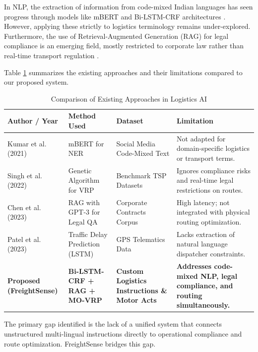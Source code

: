 \documentclass[conference]{IEEEtran}
\begin{document}
In NLP, the extraction of information from code-mixed Indian languages has seen progress through models like mBERT and Bi-LSTM-CRF architectures \cite{hinglish_ner}. However, applying these strictly to logistics terminology remains under-explored. Furthermore, the use of Retrieval-Augmented Generation (RAG) for legal compliance is an emerging field, mostly restricted to corporate law rather than real-time transport regulation \cite{rag_legal}.

Table \ref{tab:comparison} summarizes the existing approaches and their limitations compared to our proposed system.

\begin{table}[htbp]
\caption{Comparison of Existing Approaches in Logistics AI}
\begin{center}
\begin{tabularx}{\textwidth}{|l|l|X|X|}
\hline
\textbf{Author / Year} & \textbf{Method Used} & \textbf{Dataset} & \textbf{Limitation} \\
\hline
Kumar et al. (2021) \cite{hinglish_ner} & mBERT for NER & Social Media Code-Mixed Text & Not adapted for domain-specific logistics or transport terms. \\
\hline
Singh et al. (2022) \cite{vrp_traditional} & Genetic Algorithm for VRP & Benchmark TSP Datasets & Ignores compliance risks and real-time legal restrictions on routes. \\
\hline
Chen et al. (2023) \cite{rag_legal} & RAG with GPT-3 for Legal QA & Corporate Contracts Corpus & High latency; not integrated with physical routing optimization. \\
\hline
Patel et al. (2023) \cite{logistics_india} & Traffic Delay Prediction (LSTM) & GPS Telematics Data & Lacks extraction of natural language dispatcher constraints. \\
\hline
\textbf{Proposed (FreightSense)} & \textbf{Bi-LSTM-CRF + RAG + MO-VRP} & \textbf{Custom Logistics Instructions \& Motor Acts} & \textbf{Addresses code-mixed NLP, legal compliance, and routing simultaneously.} \\
\hline
\end{tabularx}
\label{tab:comparison}
\end{center}
\end{table}

The primary gap identified is the lack of a unified system that connects unstructured multi-lingual instructions directly to operational compliance and route optimization. FreightSense bridges this gap.
\end{document}
